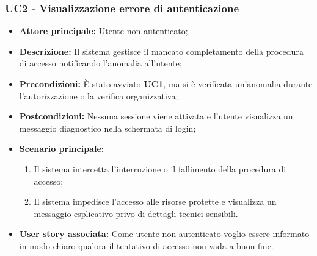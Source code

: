 \subsubsection{UC2 - Visualizzazione errore di autenticazione}
\begin{itemize}
    \item \textbf{Attore principale:} Utente non autenticato;
    \item \textbf{Descrizione:} Il sistema gestisce il mancato completamento della procedura di accesso notificando l'anomalia all'utente;
    \item \textbf{Precondizioni:} È stato avviato \textbf{UC1}, ma si è verificata un'anomalia durante l'autorizzazione o la verifica organizzativa;
    \item \textbf{Postcondizioni:} Nessuna sessione viene attivata e l'utente visualizza un messaggio diagnostico nella schermata di login;
    \item \textbf{Scenario principale:}
    \begin{enumerate}
        \item Il sistema intercetta l'interruzione o il fallimento della procedura di accesso;
        \item Il sistema impedisce l'accesso alle risorse protette e visualizza un messaggio esplicativo privo di dettagli tecnici sensibili.
    \end{enumerate}
    \item \textbf{User story associata:} Come utente non autenticato voglio essere informato in modo chiaro qualora il tentativo di accesso non vada a buon fine.
\end{itemize}

